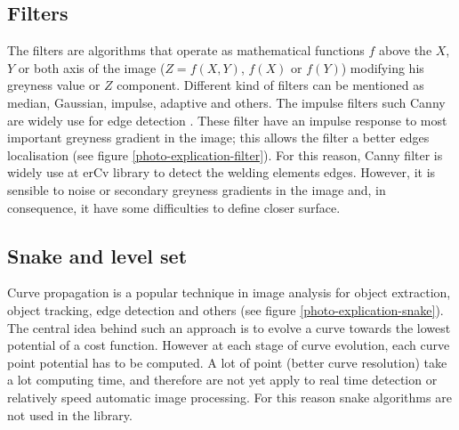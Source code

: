 \subsection{Filters}
\label{filters}

The filters are algorithms that operate as mathematical functions 
$f$ above the $X$, $Y$ or both axis of the image ($Z = f(X,Y)$,  
$f(X)$ or $f(Y)$)  modifying his greyness value or $Z$ component. 
Different kind of filters can be mentioned as median, Gaussian, 
impulse, adaptive and others. The impulse filters such Canny are
 widely use for edge detection \cite{COCQUEREZ}. These filter have
 an impulse response to most important greyness gradient in the 
image; this allows the filter a better edges localisation (see 
figure \ref{photo-explication-filter}). For this reason, Canny 
filter is widely use at erCv library to detect the welding 
elements edges. However, it is sensible to noise or secondary
 greyness gradients in the image and, in consequence, it have 
some difficulties to define closer surface.

\subsection{Snake and level set}
\label{snake-and-level-set}
 
Curve propagation is a popular technique in image analysis 
for object extraction, object tracking, edge detection and 
others (see figure \ref{photo-explication-snake}). The central
 idea behind such an approach is to evolve a curve towards 
the lowest potential of a cost function. However at each 
stage of curve evolution, each curve point potential has 
to be computed. A lot of point (better curve resolution) 
take a lot computing time, and therefore are not yet apply
 to real time detection or relatively speed automatic image
 processing. For this reason snake algorithms are not used in the library.


